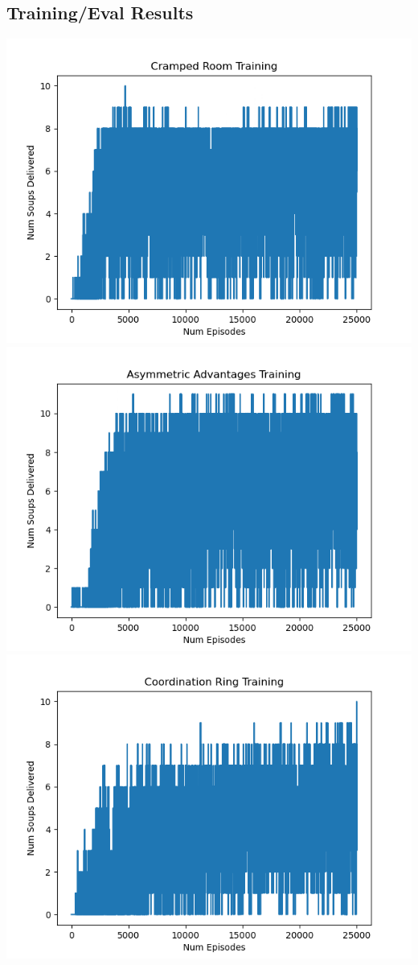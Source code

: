 \documentclass[conference]{IEEEtran}
\begin{document}
\subsection{Training/Eval Results}
\includegraphics[scale=0.5]{crampedroom_training.png}
\includegraphics[scale=0.5]{assym_training.png}
\includegraphics[scale=0.5]{coordring_training.png}
\end{document}
